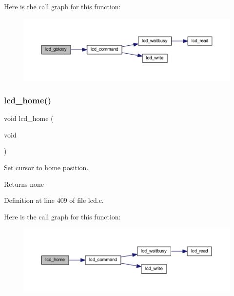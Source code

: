Here is the call graph for this function\+:\nopagebreak
\begin{figure}[H]
\begin{center}
\leavevmode
\includegraphics[width=350pt]{group__pfleury__lcd_gadbf47a5efdf02367ded1ebf8f9edb5fe_cgraph}
\end{center}
\end{figure}
\mbox{\label{group__pfleury__lcd_ga3aabf730aa4e0393bb5c959583c00a8e}} 
\subsubsection{\texorpdfstring{lcd\_home()}{lcd\_home()}}
{\footnotesize\ttfamily void lcd\+\_\+home (\begin{DoxyParamCaption}\item[{void}]{ }\end{DoxyParamCaption})}



Set cursor to home position. 

\begin{DoxyReturn}{Returns}
none 
\end{DoxyReturn}


Definition at line 409 of file lcd.\+c.

Here is the call graph for this function\+:\nopagebreak
\begin{figure}[H]
\begin{center}
\leavevmode
\includegraphics[width=350pt]{group__pfleury__lcd_ga3aabf730aa4e0393bb5c959583c00a8e_cgraph}
\end{center}
\end{figure}
\mbox{\label{group__pfleury__lcd_ga9af28b2779326b63ff4356e2b1828984}} 
